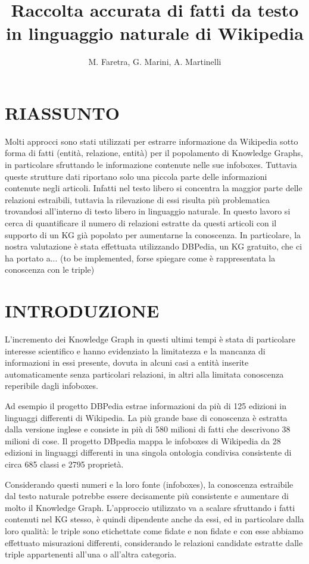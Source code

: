 \documentclass[10pt,a4paper,twocolumn]{article}
\author{M. Faretra, G. Marini, A. Martinelli}
\title{Raccolta accurata di fatti da testo in linguaggio naturale di Wikipedia}
\begin{document}
	
\maketitle
		
\section*{RIASSUNTO}
		
Molti approcci sono stati utilizzati per estrarre informazione da Wikipedia sotto forma di fatti (entità, relazione, entità) per il popolamento di Knowledge Graphs, in particolare sfruttando le informazione contenute nelle sue infoboxes. Tuttavia queste strutture dati riportano solo una piccola parte delle informazioni contenute negli articoli. Infatti nel testo libero si concentra la maggior parte delle relazioni estraibili, tuttavia la rilevazione di essi risulta più problematica trovandosi all'interno di testo libero in linguaggio naturale. In questo lavoro si cerca di quantificare il numero di relazioni estratte da questi articoli con il supporto di un KG già popolato per aumentarne la conoscenza. In particolare, la nostra valutazione è stata effettuata utilizzando DBPedia, un KG gratuito, che ci ha portato a... (to be implemented, forse spiegare come è rappresentata la conoscenza con le triple)
		
\section{INTRODUZIONE} 
		
L'incremento dei Knowledge Graph in questi ultimi tempi è stata di particolare interesse scientifico e hanno evidenziato la limitatezza e la mancanza di informazioni in essi presente, dovuta in alcuni casi a entità inserite automaticamente senza particolari relazioni, in altri alla limitata conoscenza reperibile dagli infoboxes.
		
Ad esempio il progetto DBPedia estrae informazioni da più di 125 edizioni in linguaggi differenti di Wikipedia. La più grande base di conoscenza è estratta dalla versione inglese e consiste in più di 580 milioni di fatti che descrivono 38 milioni di cose. Il progetto DBpedia mappa le infoboxes di Wikipedia da 28 edizioni in linguaggi differenti in una singola ontologia condivisa consistente di circa 685 classi e 2795 proprietà. 
		
Considerando questi numeri e la loro fonte (infoboxes), la conoscenza estraibile dal testo naturale potrebbe essere decisamente più consistente e aumentare di molto il Knowledge Graph. L'approccio utilizzato va a scalare sfruttando i fatti contenuti nel KG stesso, è quindi dipendente anche da essi, ed in particolare dalla loro qualità: le triple sono etichettate come fidate e non fidate e con esse abbiamo effettuato misurazioni differenti, considerando le relazioni candidate estratte dalle triple appartenenti all'una o all'altra categoria.
		
\end{document}
